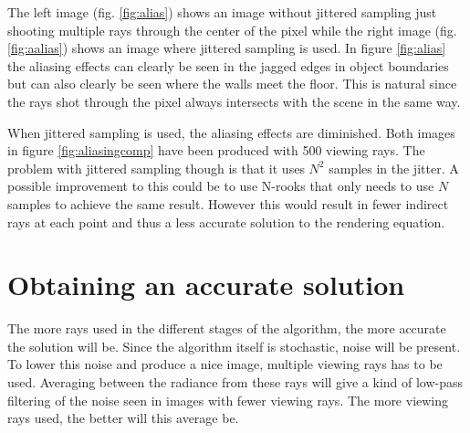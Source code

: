 \documentclass[a4paper]{report}
\begin{document}
The left image (fig. \ref{fig:alias}) shows an image
without jittered sampling just shooting multiple rays through the
center of the pixel while the right image (fig. \ref{fig:aalias}) shows an image where
jittered sampling is used. In figure \ref{fig:alias} the aliasing
effects can clearly be seen in the jagged edges in object boundaries
but can also clearly be seen where the walls meet the floor. This is
natural since the rays shot through the pixel always intersects with
the scene in the same way. 

When jittered sampling is used, the aliasing effects are
diminished. Both images in figure \ref{fig:aliasingcomp} have been
produced with 500 viewing rays. The problem with jittered sampling
though is that it uses \(N^2\) samples in the jitter. A possible
improvement to this could be to use N-rooks that only needs to use
\(N\) samples to achieve the same result. However this would result in
fewer indirect rays at each point and thus a less accurate solution to
the rendering equation.

\section{Obtaining an accurate solution}

The more rays used in the different stages of the algorithm, the more
accurate the solution will be. Since the algorithm itself is
stochastic, noise will be present. To lower this noise and produce a
nice image, multiple viewing rays has to be used. Averaging between
the radiance from these rays will give a kind of low-pass filtering of
the noise seen in images with fewer viewing rays. The more viewing
rays used, the better will this average be.
\end{document}

